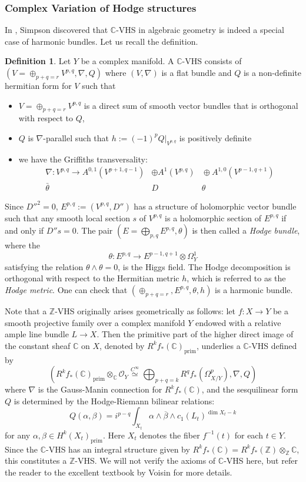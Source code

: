\documentclass[english]{amsproc}
\theoremstyle{plain}
\theoremstyle{definition}
\newtheorem{dfn}[thm]{Definition}
\theoremstyle{remark}
\theoremstyle{plain}
\numberwithin{equation}{thm} %
\newcommand{\bC}{\mathbb{C}}
\begin{document}
\subsubsection{Complex Variation of Hodge structures}
In \cite{Sim88}, Simpson discovered that $\bC$-VHS in algebraic geometry is indeed a special case of harmonic bundles. Let us recall the definition. 
\begin{dfn}
	Let $Y$ be a complex manifold. A $\bC$-VHS consists of $(V=\oplus_{p+q=r}V^{p,q},\nabla,Q) $ where $(V,\nabla)$ is a flat bundle and $Q$ is a non-definite hermitian form for $V$  such that
	\begin{itemize}
		\item $V=\oplus_{p+q=r}V^{p,q}$ is a direct sum of smooth vector bundles that is orthogonal with respect to $Q$,
		\item $Q$ is  $\nabla$-parallel such that $h:=(-1)^pQ|_{V^{p,q}}$ is positively definite
		\item we have   the Griffiths transversality:
		\[
		\begin{array}{ccc}
			\nabla: V^{p,q} \to A^{0,1}(V^{p+1,q-1})\!\!\!\! & \oplus A^1(V^{p,q}) &\!\!\!\! \oplus A^{1,0}(V^{p-1,q+1}) \\
			\bar{\theta} & D  & \theta
		\end{array}
		\]
	\end{itemize} 
\end{dfn} 
Since $D''^2=0$,  \(E^{p,q}:=(V^{p,q},D'')\) has a structure of  holomorphic vector bundle such that any  smooth local  section $s$ of $V^{p,q}$ is a holomorphic section of $E^{p,q}$ if and only if $D''s=0$.  
The pair \((E=\bigoplus_{p,q} E^{p,q},\theta)\) is then called a \emph{Hodge bundle}, where the 
\[
\theta: E^{p,q}\longrightarrow E^{p-1,q+1}\otimes \Omega_Y^1
\]
satisfying the relation \(\theta\wedge\theta=0\), is  the 
 Higgs field. 
The Hodge decomposition is orthogonal with respect to the Hermitian metric \(h\), which is 
referred to as the \emph{Hodge metric}. One can check that $(\oplus_{p+q=r},E^{p,q},\theta,h)$ is a harmonic bundle.  
 

Note that a $\mathbb{Z}$-VHS originally arises geometrically as follows: let $f:X\to Y$ be a smooth projective family over a complex manifold $Y$ endowed with a relative ample line bundle $L\to X$. Then the primitive part of the higher direct image of the constant sheaf $\mathbb{C}$ on $X$, denoted by $R^kf_*(\mathbb{C})_{\mathrm{prim}}$, underlies a $\mathbb{C}$-VHS defined by$$\left( R^kf_*(\mathbb{C})_{\mathrm{prim}}\otimes_{\mathbb{C}} \mathcal{O}_Y \stackrel{C^\infty}{\simeq} \bigoplus_{p+q=k}R^qf_*(\Omega_{X/Y}^p), \nabla, Q \right)$$where $\nabla$ is the Gauss-Manin connection for $R^kf_*(\mathbb{C})$, and the sesquilinear form $Q$ is determined by the Hodge-Riemann bilinear relations:$$Q(\alpha, \beta) = i^{p-q}\int_{X_t}\alpha\wedge \overline{\beta}\wedge c_1(L_t)^{\dim X_t-k}$$ for any $\alpha, \beta\in H^{k}(X_t)_{\mathrm{prim}}$. Here $X_t$ denotes the fiber $f^{-1}(t)$ for each $t \in Y$.  Since the $\mathbb{C}$-VHS has an integral structure given by $R^kf_*(\mathbb{C})=R^kf_*(\mathbb{Z})\otimes_{\mathbb{Z}} \mathbb{C}$, this constitutes a $\mathbb{Z}$-VHS. We will not verify the axioms of $\bC$-VHS here, but refer the reader to the excellent textbook by Voisin \cite{Voi02} for more details.
\end{document}
